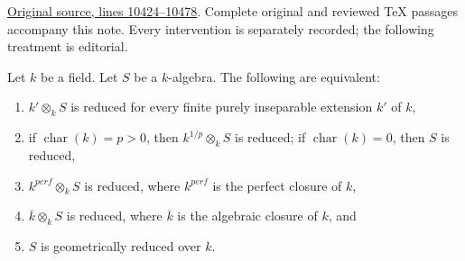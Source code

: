 \hypertarget{algebra-context-123}{}

\noindent\href{https://github.com/stacks/stacks-project/blob/a04446e57ec1fbc252a871afcec7752fb2807b14/algebra.tex\#L10424}{Original source, lines 10424--10478}. Complete original and reviewed TeX passages accompany this note. Every intervention is separately recorded; the following treatment is editorial.


\begin{lemma}
\label{editorial-source-lemma-geometrically-reduced-finite-purely-inseparable-extension}
Let $k$ be a field. Let $S$ be a $k$-algebra.
The following are equivalent:
\begin{enumerate}
\item $k' \otimes_k S$ is reduced for every finite
purely inseparable extension $k'$ of $k$,
\item if $\operatorname{char}(k)=p>0$, then
$k^{1/p}\otimes_k S$ is reduced; if
$\operatorname{char}(k)=0$, then $S$ is reduced,
\item $k^{perf} \otimes_k S$ is reduced, where $k^{perf}$ is the
perfect closure of $k$,
\item $\overline{k} \otimes_k S$ is reduced, where $\overline{k}$ is the
algebraic closure of $k$, and
\item $S$ is geometrically reduced over $k$.
\end{enumerate}
\end{lemma}

